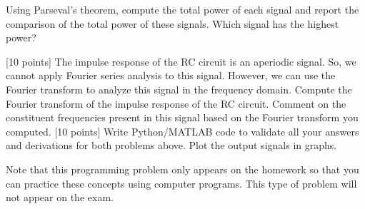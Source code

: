 \documentclass{ee102_pset}
\begin{document}
Using Parseval's theorem, compute the total power of each signal and report the comparison of the total power of these signals. Which signal has the highest power?

[10 points] The impulse response of the RC circuit is an aperiodic signal. So, we cannot apply Fourier series analysis to this signal. However, we can use the Fourier transform to analyze this signal in the frequency domain. Compute the Fourier transform of the impulse response of the RC circuit. Comment on the constituent frequencies present in this signal based on the Fourier transform you computed.
[10 points] Write Python/MATLAB code to validate all your answers and derivations for both problems above. Plot the output signals in graphs.  

{\color{red}Note that this programming problem only appears on the homework so that you can practice these concepts using computer programs. This type of problem will not appear on the exam.}
\end{document}
